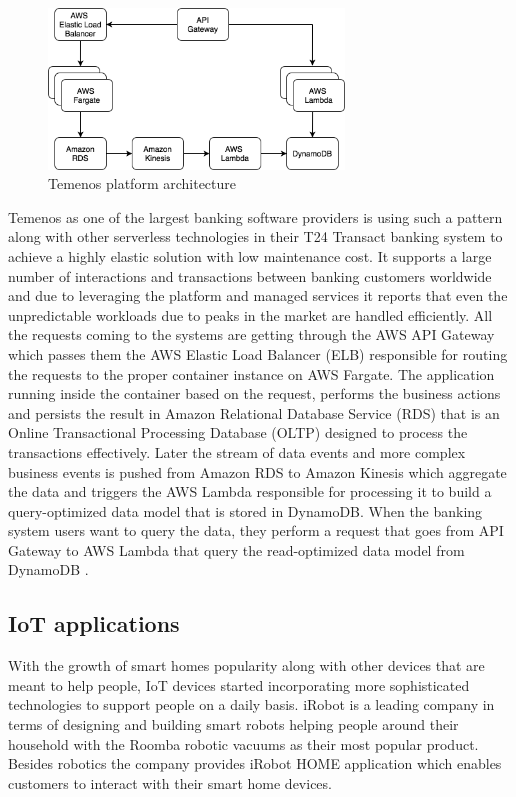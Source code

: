 \begin{figure}[h]
    \centering
    \includegraphics[width=0.7\textwidth]{assets/02-serverless/TemenosArchitecture.png}
    \caption{Temenos platform architecture}
    \label{fig:temenos-architecture-diagram}
\end{figure}

Temenos as one of the largest banking software providers is using such a pattern along with other serverless technologies in their T24 Transact banking system to achieve a highly elastic solution with low maintenance cost. It supports a large number of interactions and transactions between banking customers worldwide and due to leveraging the platform and managed services it reports that even the unpredictable workloads due to peaks in the market are handled efficiently. All the requests coming to the systems are getting through the AWS API Gateway which passes them the AWS Elastic Load Balancer (ELB) responsible for routing the requests to the proper container instance on AWS Fargate. The application running inside the container based on the request, performs the business actions and persists the result in Amazon Relational Database Service (RDS) that is an Online Transactional Processing Database (OLTP) designed to process the transactions effectively. Later the stream of data events and more complex business events is pushed from Amazon RDS to Amazon Kinesis which aggregate the data and triggers the AWS Lambda responsible for processing it to build a query-optimized data model that is stored in DynamoDB. When the banking system users want to query the data, they perform a request that goes from API Gateway to AWS Lambda that query the read-optimized data model from DynamoDB \cite{ThisIsMyAchitectureTemenos}.

\subsection{IoT applications}

With the growth of smart homes popularity along with other devices that are meant to help people, IoT devices started incorporating more sophisticated technologies to support people on a daily basis. iRobot is a leading company in terms of designing and building smart robots helping people around their household with the Roomba robotic vacuums as their most popular product. Besides robotics the company provides iRobot HOME application which enables customers to interact with their smart home devices.

